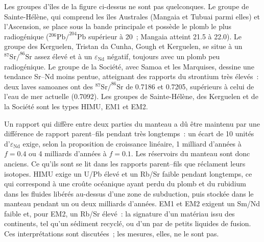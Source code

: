 Les groupes d'îles de la figure ci-dessus ne sont pas quelconques. Le groupe de Sainte-Hélène,
qui comprend les îles Australes (Mangaia et Tubuai parmi elles) et l'Ascension,
se place sous la bande principale et possède le plomb le plus radiogénique
($^{206}\mathrm{Pb}/^{204}\mathrm{Pb}$ supérieur à 20~; Mangaia atteint 21.5 à 22.0). Le
groupe des Kerguelen, Tristan da Cunha, Gough et Kerguelen, se situe à un
$^{87}\mathrm{Sr}/^{86}\mathrm{Sr}$ assez élevé et à un $\varepsilon_{\mathrm{Nd}}$ négatif, toujours avec
un plomb peu radiogénique. Le groupe de la Société, avec Samoa et les Marquises, dessine une
tendance Sr--Nd moins pentue, atteignant des rapports du strontium très élevés~: deux laves samoanes
ont des $^{87}\mathrm{Sr}/^{86}\mathrm{Sr}$ de 0.7186 et 0.7205, supérieurs à
celui de l'eau de mer actuelle (0.7092). Les groupes de Sainte-Hélène, des Kerguelen et de la Société sont les types
HIMU, EM1 et EM2.

Un rapport qui diffère entre deux parties du manteau a dû être maintenu par une différence
de rapport parent--fils pendant très longtemps~: un écart de 10 unités
d'$\varepsilon_{\mathrm{Nd}}$ exige, selon la proposition de croissance linéaire, 1 milliard d'années à $f = 0.4$
ou 4 milliards d'années à $f = 0.1$. Les réservoirs du manteau sont donc anciens.
Ce qu'ils sont se lit dans les rapports parent--fils que réclament leurs isotopes. HIMU exige
un U/Pb élevé et un Rb/Sr faible pendant longtemps, ce qui correspond à une croûte océanique
ayant perdu du plomb et du rubidium dans les fluides libérés au-dessus d'une zone de subduction,
puis stockée dans le manteau pendant un ou deux milliards d'années.
EM1 et EM2 exigent un Sm/Nd faible et, pour EM2, un Rb/Sr élevé~: la signature
d'un matériau issu des continents, tel qu'un sédiment recyclé, ou d'un 
par de petits liquides de fusion. Ces interprétations sont discutées~;
les mesures, elles, ne le sont pas.

